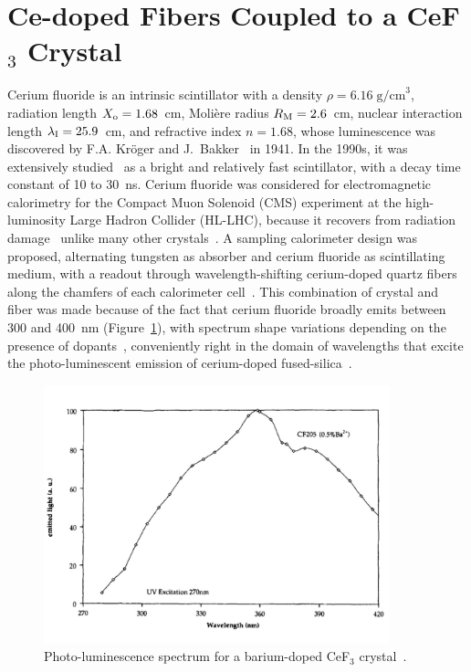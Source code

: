 \documentclass[a4paper,11pt]{article}
\begin{document}
\section{Ce-doped Fibers Coupled to a CeF\texorpdfstring{$_3$}{} Crystal}
\label{sec:WLS}
Cerium fluoride is an intrinsic scintillator with a density $\rho=6.16\; {\mathrm{g/cm}}^3$, radiation length $X_{\rm o} = 1.68$~cm, Moli\`ere radius $R_{\rm M} = 2.6$~cm, nuclear interaction length $\lambda_{\rm I} = 25.9$~cm, and refractive index $n = 1.68$, whose luminescence was discovered by F.A. Kr\"oger and J.~Bakker~\cite{r-KRO} in 1941. In the 1990s, it was extensively studied~\cite{r-AND,r-MOS} as a bright and relatively fast scintillator, with a decay time constant of 10 to 30~ns. Cerium fluoride was considered for electromagnetic calorimetry for the Compact Muon Solenoid (CMS) experiment at the high-luminosity Large Hadron Collider (HL-LHC), because it recovers from radiation damage~\cite{r-NIMCEF3} unlike many other crystals~\cite{r-FISSNIM, r-NIMLYSO}. A sampling calorimeter design was proposed, alternating tungsten as absorber and cerium fluoride as scintillating medium, with a readout through wavelength-shifting cerium-doped quartz fibers along the chamfers of each calorimeter cell~\cite{r-CALORCEF3, r-WCEF3FRA, r-WCEF3H4}. This combination of crystal and fiber was made because of the fact that cerium fluoride broadly emits between 300 and 400~nm (Figure~\ref{fig:cef3spectrum}), with spectrum shape variations depending on the presence of dopants~\cite{r-EACEF3}, conveniently right in the domain of wavelengths that excite the photo-luminescent emission of cerium-doped fused-silica~\cite{r-vedda}.

\begin{figure}[ht]
\begin{center}
      \includegraphics[width=10cm]{Figures/SpectrumCeF3.pdf}
\caption{\small Photo-luminescence spectrum for a barium-doped CeF$_3$ crystal~\cite{r-EACEF3}.}
    \label{fig:cef3spectrum}
\end{center}
\end{figure}
\end{document}
